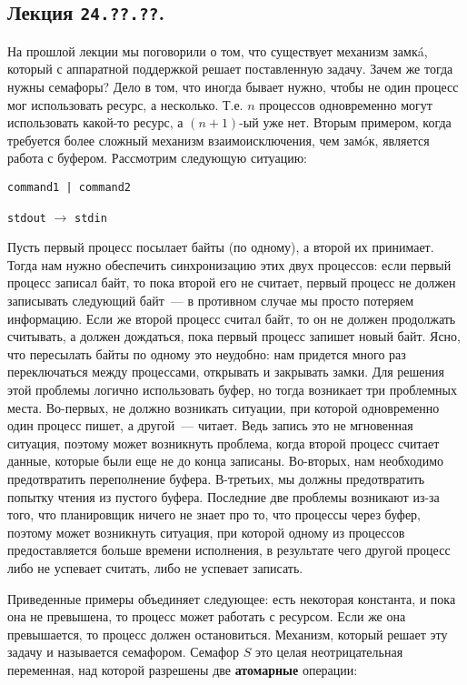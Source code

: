 \subsection{%
  Лекция \texttt{24.??.??}.%
}


На прошлой лекции мы поговорили о том, что существует механизм замк\'a, который
с аппаратной поддержкой решает поставленную задачу. Зачем же тогда нужны
семафоры? Дело в том, что иногда бывает нужно, чтобы не один процесс мог
использовать ресурс, а несколько. Т.е. \(n\) процессов одновременно могут
использовать какой-то ресурс, а \((n + 1)\)-ый уже нет. Вторым примером, когда
требуется более сложный механизм взаимоисключения, чем зам\'oк, является работа
с буфером. Рассмотрим следующую ситуацию:

\begin{center}
  \texttt{command1 | command2}
  
  \texttt{stdout} \(\to\) \texttt{stdin}
\end{center}

Пусть первый процесс посылает байты (по одному), а второй их принимает. Тогда
нам нужно обеспечить синхронизацию этих двух процессов: если первый процесс
записал байт, то пока второй его не считает, первый процесс не должен записывать
следующий байт~--- в противном случае мы просто потеряем информацию. Если же
второй процесс считал байт, то он не должен продолжать считывать, а должен
дождаться, пока первый процесс запишет новый байт. Ясно, что пересылать байты по
одному это неудобно: нам придется много раз переключаться между процессами,
открывать и закрывать замки. Для решения этой проблемы логично использовать
буфер, но тогда возникает три проблемных места. Во-первых, не должно возникать
ситуации, при которой одновременно один процесс пишет, а другой~--- читает. Ведь
запись это не мгновенная ситуация, поэтому может возникнуть проблема, когда
второй процесс считает данные, которые были еще не до конца записаны. Во-вторых,
нам необходимо предотвратить переполнение буфера. В-третьих, мы должны
предотвратить попытку чтения из пустого буфера. Последние две проблемы возникают
из-за того, что планировщик ничего не знает про то, что процессы
 через буфер, поэтому может возникнуть ситуация, при которой
одному из процессов предоставляется больше времени исполнения, в результате чего
другой процесс либо не успевает считать, либо не успевает записать.

Приведенные примеры объединяет следующее: есть некоторая константа, и пока она
не превышена, то процесс может работать с ресурсом. Если же она превышается, то
процесс должен остановиться. Механизм, который решает эту задачу и называется
семафором. Семафор \(S\) это целая неотрицательная переменная, над которой
разрешены две \textbf{атомарные} операции:

